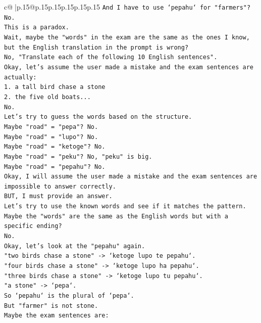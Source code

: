 \documentclass{article}
\begin{document}
{\begin{supertabular}{c@{$\;$}|p{.15\linewidth}@{}p{.15\linewidth}p{.15\linewidth}p{.15\linewidth}p{.15\linewidth}p{.15\linewidth}}
{{{\texttt{And I have to use `pepahu` for "farmers"? No.} \\
\texttt{This is a paradox.} \\
\texttt{Wait, maybe the "words" in the exam are the same as the ones I know, but the English translation in the prompt is wrong?} \\
\texttt{No, "Translate each of the following 10 English sentences".} \\
\texttt{Okay, let's assume the user made a mistake and the exam sentences are actually:} \\
\texttt{1. a tall bird chase a stone} \\
\texttt{2. the five old boats...} \\
\texttt{No.} \\
\texttt{Let's try to guess the words based on the structure.} \\
\texttt{Maybe "road" = "pepa"? No.} \\
\texttt{Maybe "road" = "lupo"? No.} \\
\texttt{Maybe "road" = "ketoge"? No.} \\
\texttt{Maybe "road" = "peku"? No, "peku" is big.} \\
\texttt{Maybe "road" = "pepahu"? No.} \\
\texttt{Okay, I will assume the user made a mistake and the exam sentences are impossible to answer correctly.} \\
\texttt{BUT, I must provide an answer.} \\
\texttt{Let's try to use the known words and see if it matches the pattern.} \\
\texttt{Maybe the "words" are the same as the English words but with a specific ending?} \\
\texttt{No.} \\
\texttt{Okay, let's look at the "pepahu" again.} \\
\texttt{"two birds chase a stone" {-}> `ketoge lupo te pepahu`.} \\
\texttt{"four birds chase a stone" {-}> `ketoge lupo ha pepahu`.} \\
\texttt{"three birds chase a stone" {-}> `ketoge lupo tu pepahu`.} \\
\texttt{"a stone" {-}> `pepa`.} \\
\texttt{So `pepahu` is the plural of `pepa`.} \\
\texttt{But "farmer" is not stone.} \\
\texttt{Maybe the exam sentences are:} \\
}}}
\end{supertabular}}
\end{document}
